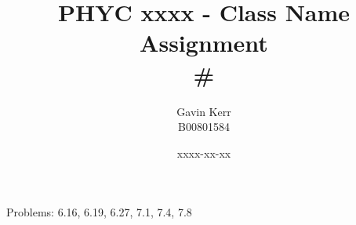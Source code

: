 \documentclass[12pt, a4paper]{article}
\title{PHYC xxxx - Class Name\\Assignment \\ \#}
\author{Gavin Kerr\\B00801584}
\date{xxxx-xx-xx}
\begin{document}
\maketitle
Problems: 6.16, 6.19, 6.27, 7.1, 7.4, 7.8
\end{document}
